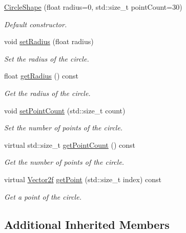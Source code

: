 \begin{DoxyCompactItemize}
\item 
\hyperlink{classsf_1_1_circle_shape_aaebe705e7180cd55588eb19488af3af1}{Circle\+Shape} (float radius=0, std\+::size\+\_\+t point\+Count=30)
\begin{DoxyCompactList}\small\item\em Default constructor. \end{DoxyCompactList}\item 
void \hyperlink{classsf_1_1_circle_shape_a21cdf85fc2f201e10222a241af864be0}{set\+Radius} (float radius)
\begin{DoxyCompactList}\small\item\em Set the radius of the circle. \end{DoxyCompactList}\item 
float \hyperlink{classsf_1_1_circle_shape_aa3dd5a1b5031486ce5b6f09d43674aa3}{get\+Radius} () const
\begin{DoxyCompactList}\small\item\em Get the radius of the circle. \end{DoxyCompactList}\item 
void \hyperlink{classsf_1_1_circle_shape_a16590ee7bdf5c9f752275468a4997bed}{set\+Point\+Count} (std\+::size\+\_\+t count)
\begin{DoxyCompactList}\small\item\em Set the number of points of the circle. \end{DoxyCompactList}\item 
virtual std\+::size\+\_\+t \hyperlink{classsf_1_1_circle_shape_a014d29ec11e8afa4dce50e7047d99601}{get\+Point\+Count} () const
\begin{DoxyCompactList}\small\item\em Get the number of points of the circle. \end{DoxyCompactList}\item 
virtual \hyperlink{classsf_1_1_vector2}{Vector2f} \hyperlink{classsf_1_1_circle_shape_a2d7f9715502b960b92387102fddb8736}{get\+Point} (std\+::size\+\_\+t index) const
\begin{DoxyCompactList}\small\item\em Get a point of the circle. \end{DoxyCompactList}\end{DoxyCompactItemize}
\subsection*{Additional Inherited Members}


